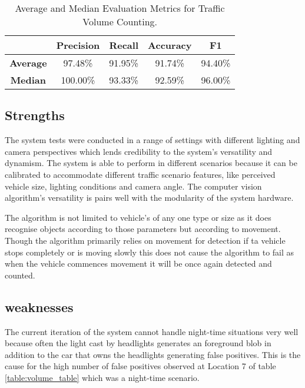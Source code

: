 \begin{table}[H]
\centering
\begin{tabular}{|ccccc|}
    \hline
                    &\textbf{Precision}&\textbf{Recall}&\textbf{Accuracy}&\textbf{F1}\\\hline
    \textbf{Average}&97.48\%&91.95\%&91.74\%&94.40\%\\\hline
    \textbf{Median}&100.00\%&93.33\%&92.59\%&96.00\%\\\hline
\end{tabular}
\caption{Average and Median Evaluation Metrics for Traffic Volume Counting.}
\label{table:averages}
\end{table}

\subsection{Strengths}

The system tests were conducted in a range of settings with different lighting and camera perspectives which lends credibility to the system's versatility and dynamism. The system is able to perform in different scenarios because it can be calibrated to accommodate different traffic scenario features, like perceived vehicle size, lighting conditions and camera angle. The computer vision algorithm's versatility is pairs well with the modularity of the system hardware. 

The algorithm is not limited to vehicle's of any one type or size as it does recognise objects according to those parameters but according to movement. Though the algorithm primarily relies on movement for detection if ta vehicle stops completely or is moving slowly this does not cause the algorithm to fail as when the vehicle commences movement it will be once again detected and counted.

\subsection{weaknesses}

The current iteration of the system cannot handle night-time situations very well because often the light cast by headlights generates an foreground blob in addition to the car that owns the headlights generating false positives. This is the cause for the high number of false positives observed at Location 7 of table \ref{table:volume_table} which was a night-time scenario. 

